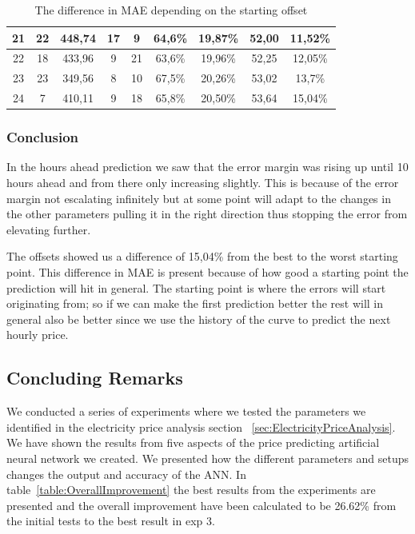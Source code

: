 \begin{table}[H]
{\begin{tabular}{|c|c|c|c|c|c|c|c|c|}
	21 & 22  & 448,74 & 17 & 9  & 64,6\% & 19,87\% & 52,00 & 11,52\% \\ \hline
	22 & 18  & 433,96 & 9  & 21 & 63,6\% & 19,96\% & 52,25 & 12,05\% \\ \hline
	23 & 23  & 349,56 & 8  & 10 & 67,5\% & 20,26\% & 53,02 & 13,7\% \\ \hline
	24 & 7   & 410,11 & 9  & 18 & 65,8\% & 20,50\% & 53,64 & 15,04\% \\ \hline
	\end{tabular}
}
\caption{The difference in MAE depending on the starting offset} %
\label{table:Offsets} %
\end{table}

\subsubsection{Conclusion}
In the hours ahead prediction we saw that the error margin was rising up until 10 hours ahead and from there only increasing slightly. This is because of the error margin not escalating infinitely but at some point will adapt to the changes in the other parameters pulling it in the right direction thus stopping the error from elevating further.

The offsets showed us a difference of 15,04\% from the best to the worst starting point. This difference in MAE is present because of how good a starting point the prediction will hit in general. The starting point is where the errors will start originating from; so if we can make the first prediction better the rest will in general also be better since we use the history of the curve to predict the next hourly price.

\newpage
\subsection{Concluding Remarks}
We conducted a series of experiments where we tested the parameters we identified in the electricity price analysis section ~\ref{sec:ElectricityPriceAnalysis}. We have shown the results from five aspects of the price predicting artificial neural network we created. We presented how the different parameters and setups changes the output and accuracy of the ANN. In table~\ref{table:OverallImprovement} the best results from the experiments are presented and the overall improvement have been calculated to be 26.62\% from the initial tests to the best result in exp 3.

